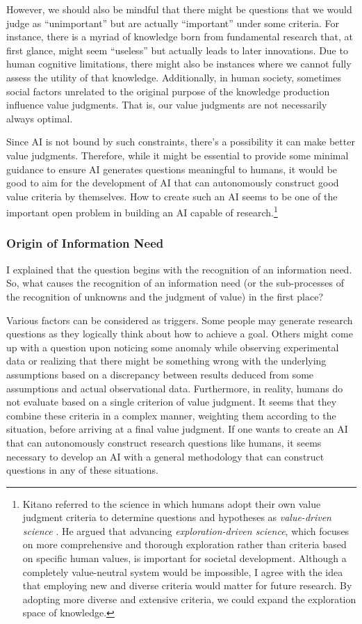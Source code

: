 However, we should also be mindful that there might be questions that we would judge as ``unimportant'' but are actually ``important'' under some criteria. For instance, there is a myriad of knowledge born from fundamental research that, at first glance, might seem ``useless'' but actually leads to later innovations. Due to human cognitive limitations, there might also be instances where we cannot fully assess the utility of that knowledge. Additionally, in human society, sometimes social factors unrelated to the original purpose of the knowledge production influence value judgments. That is, our value judgments are not necessarily always optimal.

Since AI is not bound by such constraints, there's a possibility it can make better value judgments. Therefore, while it might be essential to provide some minimal guidance to ensure AI generates questions meaningful to humans, it would be good to aim for the development of AI that can autonomously construct good value criteria by themselves. How to create such an AI seems to be one of the important open problem in building an AI capable of research.\footnote{
Kitano referred to the science in which humans adopt their own value judgment criteria to determine questions and hypotheses as \textit{value-driven science} \cite{kitano2021nobel}. He argued that advancing \textit{exploration-driven science}, which focuses on more comprehensive and thorough exploration rather than criteria based on specific human values, is important for societal development. Although a completely value-neutral system would be impossible, I agree with the idea that employing new and diverse criteria would matter for future research. By adopting more diverse and extensive criteria, we could expand the exploration space of knowledge.
} 

\subsubsection{Origin of Information Need}
I explained that the question begins with the recognition of an information need. So, what causes the recognition of an information need (or the sub-processes of the recognition of unknowns and the judgment of value) in the first place?

Various factors can be considered as triggers. Some people may generate research questions as they logically think about how to achieve a goal. Others might come up with a question upon noticing some anomaly while observing experimental data or realizing that there might be something wrong with the underlying assumptions based on a discrepancy between results deduced from some assumptions and actual observational data. Furthermore, in reality, humans do not evaluate based on a single criterion of value judgment. It seems that they combine these criteria in a complex manner, weighting them according to the situation, before arriving at a final value judgment.
If one wants to create an AI that can autonomously construct research questions like humans, it seems necessary to develop an AI with a general methodology that can construct questions in any of these situations.

